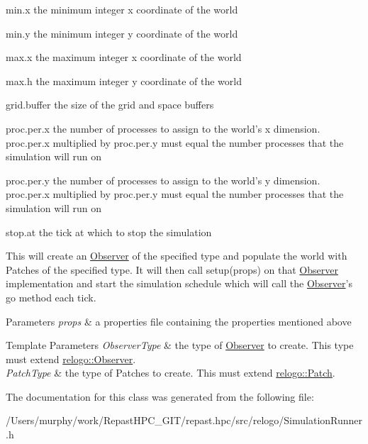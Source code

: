 \begin{DoxyItemize}
\item min.\-x the minimum integer x coordinate of the world 
\item min.\-y the minimum integer y coordinate of the world 
\item max.\-x the maximum integer x coordinate of the world 
\item max.\-h the maximum integer y coordinate of the world 
\item grid.\-buffer the size of the grid and space buffers 
\item proc.\-per.\-x the number of processes to assign to the world's x dimension. proc.\-per.\-x multiplied by proc.\-per.\-y must equal the number processes that the simulation will run on 
\item proc.\-per.\-y the number of processes to assign to the world's y dimension. proc.\-per.\-x multiplied by proc.\-per.\-y must equal the number processes that the simulation will run on 
\item stop.\-at the tick at which to stop the simulation

This will create an \hyperlink{classrepast_1_1relogo_1_1_observer}{Observer} of the specified type and populate the world with Patches of the specified type. It will then call setup(props) on that \hyperlink{classrepast_1_1relogo_1_1_observer}{Observer} implementation and start the simulation schedule which will call the \hyperlink{classrepast_1_1relogo_1_1_observer}{Observer}'s go method each tick.


\begin{DoxyParams}{Parameters}
{\em props} & a properties file containing the properties mentioned above \\
\hline
\end{DoxyParams}

\begin{DoxyTemplParams}{Template Parameters}
{\em Observer\-Type} & the type of \hyperlink{classrepast_1_1relogo_1_1_observer}{Observer} to create. This type must extend \hyperlink{classrepast_1_1relogo_1_1_observer}{relogo\-::\-Observer}. \\
\hline
{\em Patch\-Type} & the type of Patches to create. This must extend \hyperlink{classrepast_1_1relogo_1_1_patch}{relogo\-::\-Patch}. \\
\hline
\end{DoxyTemplParams}

\end{DoxyItemize}

The documentation for this class was generated from the following file\-:\begin{DoxyCompactItemize}
\item 
/\-Users/murphy/work/\-Repast\-H\-P\-C\-\_\-\-G\-I\-T/repast.\-hpc/src/relogo/Simulation\-Runner.\-h\end{DoxyCompactItemize}
